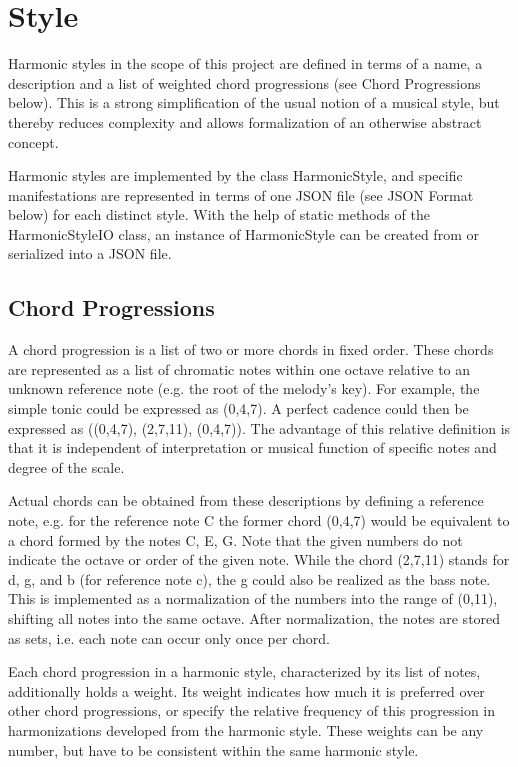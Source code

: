 
\section{Style}
Harmonic styles in the scope of this project are defined in terms of a name, a description and a list of weighted chord progressions (see Chord Progressions below). This is a strong simplification of the usual notion of a musical style, but thereby reduces complexity and allows formalization of an otherwise abstract concept.

Harmonic styles are implemented by the class HarmonicStyle, and specific manifestations are represented in terms of one JSON file (see JSON Format below) for each distinct style. With the help of static methods of the HarmonicStyleIO class, an instance of HarmonicStyle can be created from or serialized into a JSON file.

\subsection{Chord Progressions}
A chord progression is a list of two or more chords in fixed order. These chords are represented as a list of chromatic notes within one octave relative to an unknown reference note (e.g. the root of the melody's key). For example, the simple tonic could be expressed as (0,4,7). A perfect cadence could then be expressed as ((0,4,7), (2,7,11), (0,4,7)). The advantage of this relative definition is that it is independent of interpretation or musical function of specific notes and degree of the scale.

Actual chords can be obtained from these descriptions by defining a reference note, e.g. for the reference note C the former chord (0,4,7) would be equivalent to a chord formed by the notes C, E, G. Note that the given numbers do not indicate the octave or order of the given note. While the chord (2,7,11) stands for d, g, and b (for reference note c), the g could also be realized as the bass note. This is implemented as a normalization of the numbers into the range of (0,11), shifting all notes into the same octave. After normalization, the notes are stored as sets, i.e. each note can occur only once per chord.

Each chord progression in a harmonic style, characterized by its list of notes, additionally holds a weight. Its weight indicates how much it is preferred over other chord progressions, or specify the relative frequency of this progression in harmonizations developed from the harmonic style. These weights can be any number, but have to be consistent within the same harmonic style.

